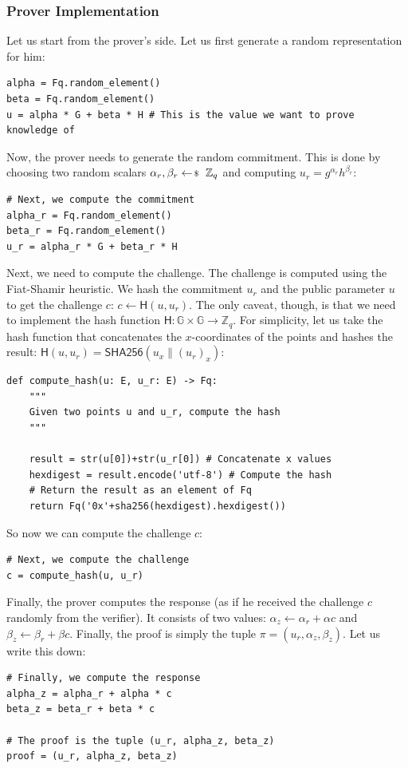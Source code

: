\documentclass[../../book.tex]{subfiles}
\begin{document}
\subsubsection{Prover Implementation}

Let us start from the prover's side. Let us first generate a random representation for him:
\begin{verbatim}
alpha = Fq.random_element()
beta = Fq.random_element()
u = alpha * G + beta * H # This is the value we want to prove knowledge of
\end{verbatim}

Now, the prover needs to generate the random commitment. This is done by choosing
two random scalars $\alpha_r, \beta_r \leftarrowS \mathbb{Z}_q$ and computing
$u_r = g^{\alpha_r}h^{\beta_r}$:
\begin{verbatim}
# Next, we compute the commitment
alpha_r = Fq.random_element()
beta_r = Fq.random_element()
u_r = alpha_r * G + beta_r * H
\end{verbatim}

Next, we need to compute the challenge. The challenge is computed using 
the Fiat-Shamir heuristic. We hash the commitment $u_r$ and the public
parameter $u$ to get the challenge $c$: $c \gets \mathsf{H}(u,u_r)$. The only 
caveat, though, is that we need to implement the hash function 
$\mathsf{H}: \mathbb{G} \times \mathbb{G} \to \mathbb{Z}_q$. For simplicity, let us 
take the hash function that concatenates the $x$-coordinates of the points
and hashes the result: $\mathsf{H}(u,u_r) = \mathsf{SHA256}(u_x \parallel (u_r)_x)$:
\begin{verbatim}
def compute_hash(u: E, u_r: E) -> Fq:
    """
    Given two points u and u_r, compute the hash
    """

    result = str(u[0])+str(u_r[0]) # Concatenate x values
    hexdigest = result.encode('utf-8') # Compute the hash
    # Return the result as an element of Fq
    return Fq('0x'+sha256(hexdigest).hexdigest())
\end{verbatim}

So now we can compute the challenge $c$:
\begin{verbatim}
# Next, we compute the challenge
c = compute_hash(u, u_r)
\end{verbatim}

Finally, the prover computes the response (as if he received the challenge $c$
randomly from the verifier). It consists of two values: $\alpha_z \gets \alpha_r
+ \alpha c$ and $\beta_z \gets \beta_r + \beta c$. Finally, the proof is simply
the tuple $\pi=(u_r,\alpha_z,\beta_z)$. Let us write this down:
\begin{verbatim}
# Finally, we compute the response
alpha_z = alpha_r + alpha * c
beta_z = beta_r + beta * c

# The proof is the tuple (u_r, alpha_z, beta_z)
proof = (u_r, alpha_z, beta_z)
\end{verbatim}
\end{document}
